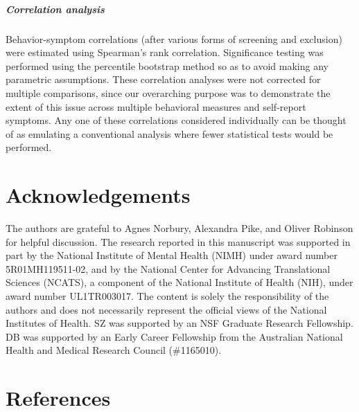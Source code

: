 \documentclass[a4paper,notitlepage,12pt]{article}
\begin{document}
\begin{refsection}[main]
\subparagraph{Correlation analysis} Behavior-symptom correlations (after various forms of screening and exclusion) were estimated using Spearman's rank correlation. Significance testing was performed using the percentile bootstrap method \cite{wilcox2018guide} so as to avoid making any parametric assumptions. These correlation analyses were not corrected for multiple comparisons, since our overarching purpose was to demonstrate the extent of this issue across multiple behavioral measures and self-report symptoms. Any one of these correlations considered individually can be thought of as emulating a conventional analysis where fewer statistical tests would be performed.

\section{Acknowledgements}

The authors are grateful to Agnes Norbury, Alexandra Pike, and Oliver Robinson for helpful discussion. The research reported in this manuscript was supported in part by the National Institute of Mental Health (NIMH) under award number 5R01MH119511-02, and by the National Center for Advancing Translational Sciences (NCATS), a component of the National Institute of Health (NIH), under award number UL1TR003017. The content is solely the responsibility of the authors and does not necessarily represent the official views of the National Institutes of Health. SZ was supported by an NSF Graduate Research Fellowship. DB was supported by an Early Career Fellowship from the Australian National Health and Medical Research Council (\#1165010).

\section*{References}

\printbibliography[heading=main]
\end{refsection}

\break

\end{document}
